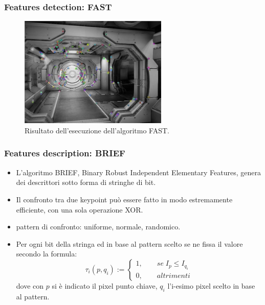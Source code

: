 \documentclass{beamer}
\begin{document}
\begin{frame}
\frametitle{Features detection: FAST}
\begin{figure}[h]
	\centering
	\includegraphics[width=200pt]{imgs/fdetection.jpg}
	\caption{Risultato dell'esecuzione dell'algoritmo FAST.}
	\label{vis:feature:detection}
\end{figure}
\end{frame}

\begin{frame}
\frametitle{Features description: BRIEF}
\begin{itemize}
	\item L'algoritmo BRIEF, Binary Robust Independent Elementary Features, genera dei descrittori sotto forma di stringhe di bit. 
	\item Il confronto tra due keypoint può essere fatto in modo estremamente efficiente, con una sola operazione XOR.
	\item pattern di confronto: uniforme, normale, randomico. 
	\item Per ogni bit della stringa ed in base al pattern scelto se ne fissa il valore secondo la formula:
	\begin{equation}
	\tau_i(p, q_i) := \begin{cases}
	1, \qquad se \; I_p \leq I_{q_i}\\
	0, \qquad altrimenti
	\end{cases}
	\end{equation}
	dove con $p$ si è indicato il pixel punto chiave, $q_i$ l'i-esimo pixel scelto in base al pattern.
\end{itemize}
\end{frame}
\end{document}
